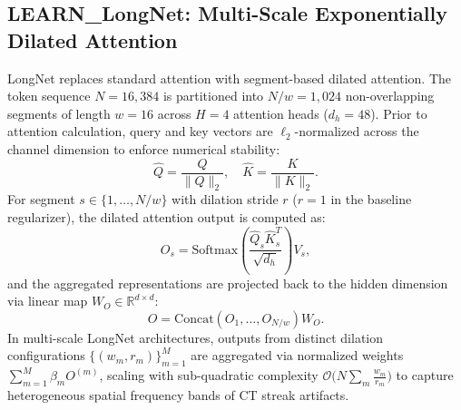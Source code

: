 \documentclass[runningheads]{llncs}
\begin{document}
\subsection{LEARN\_LongNet: Multi-Scale Exponentially Dilated Attention}
LongNet \cite{ding2023longnet} replaces standard attention with segment-based dilated attention. The token sequence $N = 16,384$ is partitioned into $N / w = 1,024$ non-overlapping segments of length $w = 16$ across $H = 4$ attention heads ($d_h = 48$). Prior to attention calculation, query and key vectors are $\ell_2$-normalized across the channel dimension to enforce numerical stability:
\begin{equation}
\hat{Q} = \frac{Q}{\|Q\|_2}, \quad \hat{K} = \frac{K}{\|K\|_2}.
\end{equation}
For segment $s \in \{1, \dots, N / w\}$ with dilation stride $r$ ($r = 1$ in the baseline regularizer), the dilated attention output is computed as:
\begin{equation}
O_s = \text{Softmax}\left( \frac{\hat{Q}_s \hat{K}_s^T}{\sqrt{d_h}} \right) V_s,
\end{equation}
and the aggregated representations are projected back to the hidden dimension via linear map $W_O \in \mathbb{R}^{d \times d}$:
\begin{equation}
O = \text{Concat}(O_1, \dots, O_{N/w}) W_O.
\end{equation}
In multi-scale LongNet architectures, outputs from distinct dilation configurations $\{ (w_m, r_m) \}_{m=1}^{M}$ are aggregated via normalized weights $\sum_{m=1}^{M} \beta_m O^{(m)}$, scaling with sub-quadratic complexity $\mathcal{O}\big(N \sum_m \frac{w_m}{r_m}\big)$ to capture heterogeneous spatial frequency bands of CT streak artifacts.
\end{document}

